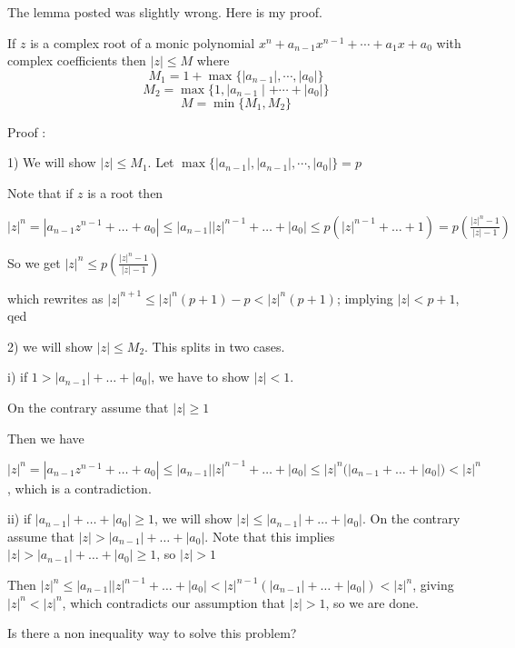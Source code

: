 \begin{solution}
	The lemma posted was slightly wrong. Here is my proof. 

If $z$ is a complex root of a monic polynomial $x^n+a_{n-1}x^{n-1}+\cdots+a_1x+a_0$ with complex coefficients then $|z| \le M $ where \[M_1=1+\max\{\mid a_{n-1}\mid,\cdots,\mid a_0\mid\}\] \[M_2=\max\{1,\mid a_{n-1}\mid +\cdots+\mid a_0\mid\}\]
\[M=\min\{M_1,M_2\}\]


Proof : 

1) We will show $|z| \le M_1$. Let $\max\{\mid a_{n-1}\mid,\mid a_{n-1}\mid,\cdots,\mid a_0\mid\} = p $

Note that if $z$ is a root then 

$|z|^n = |a_{n-1} z^{n-1} +\ldots + a_0| \le |a_{n-1}| |z|^{n-1} + \ldots +|a_0| \le p (|z|^{n-1} + \ldots + 1) = p \left ( \frac{|z|^n - 1}{|z| - 1} \right ) $

So we get $ |z|^n  \le p \left ( \frac{|z|^n - 1}{|z| - 1} \right )$

which rewrites as $|z|^{n+1} \le |z|^n (p+1) - p < |z|^n (p+1)$; implying $|z| < p+1$, qed

2) we will show $|z| \le M_2$. This splits in two cases.

i) if $1 > |a_{n-1}| + \ldots + |a_0|$, we have to show $|z| < 1$.

On the contrary assume that $|z| \ge 1$

Then we have 

$|z|^n = |a_{n-1} z^{n-1} +\ldots + a_0| \le |a_{n-1}| |z|^{n-1} + \ldots +|a_0| \le |z|^n (|a_{n-1}+ \ldots + |a_0| ) < |z|^n$, which is a contradiction.


ii) if $|a_{n-1}| + \ldots + |a_0| \ge 1$, we will show $|z| \le |a_{n-1}| + \ldots + |a_0| $. On the contrary assume that $|z| > |a_{n-1}| + \ldots + |a_0|$. Note that this implies $|z| > |a_{n-1}| + \ldots + |a_0| \ge 1$, so $|z| >1$

Then $|z|^n \le |a_{n-1}| |z|^{n-1} + \ldots +|a_0| < |z|^{n-1} (|a_{n-1}| + \ldots + |a_0| ) < |z|^{n}$, giving $|z|^n < |z|^{n}$, which contradicts our assumption that $|z| >1$, so we are done.
\end{solution}



\begin{solution}
	Is there a non inequality way to solve this problem?
\end{solution}



